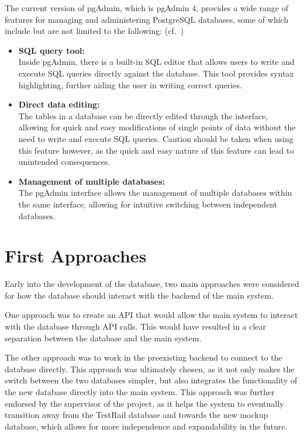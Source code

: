 The current version of pgAdmin, which is pgAdmin 4, provides a wide range of features for managing and administering PostgreSQL databases, some of which include but are not limited to the following: (cf.~\cite{pgAdminInterface})

\begin{itemize}
    \item \textbf{SQL query tool:} \\
    Inside pgAdmin, there is a built-in SQL editor that allows users to write and execute SQL queries directly against the database. This tool provides syntax highlighting, further aiding the user in writing correct queries.

    \item \textbf{Direct data editing:} \\
    The tables in a database can be directly edited through the interface, allowing for quick and easy modifications of single points of data without the need to write and execute SQL queries. Caution should be taken when using this feature however, as the quick and easy nature of this feature can lead to unintended consequences.

    \item \textbf{Management of multiple databases:} \\
    The pgAdmin interface allows the management of multiple databases within the same interface, allowing for intuitive switching between independent databases. 
\end{itemize}

\section{First Approaches}

Early into the development of the database, two main approaches were considered for how the database should interact with the backend of the main system. 

One approach was to create an API that would allow the main system to interact with the database through API calls. This would have resulted in a clear separation between the database and the main system.

The other approach was to work in the preexisting backend to connect to the database directly. This approach was ultimately chosen, as it not only makes the switch between the two databases simpler, but also integrates the functionality of the new database directly into the main system. This approach was further endorsed by the supervisor of the project, as it helps the system to eventually transition away from the TestRail database and towards the new mockup database, which allows for more independence and expandability in the future.

